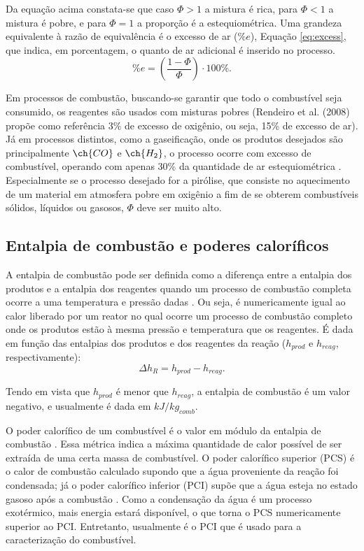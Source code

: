 Da equação acima constata-se que caso $\Phi > 1$ a mistura é rica, para $\Phi < 1$ a mistura é pobre, e para $\Phi = 1$ a proporção é a estequiométrica. Uma grandeza equivalente à razão de equivalência é o excesso de ar ($\%e$), Equação \eqref{eq:excess}, que indica, em porcentagem, o quanto de ar adicional é inserido no processo.
\begin{equation} \label{eq:excess}
\%e = \left(\frac{1-\Phi}{\Phi}\right)\cdot 100\%.
\end{equation}

Em processos de combustão, buscando-se garantir que todo o combustível seja consumido, os reagentes são usados com misturas pobres (Rendeiro et al. (2008) propõe como referência 3\% de excesso de oxigênio, ou seja, 15\% de excesso de ar). Já em processos distintos, como a gaseificação, onde os produtos desejados são principalmente $\ch{CO}$ e $\ch{H_2}$, o processo ocorre com excesso de combustível, operando com apenas 30\% da quantidade de ar estequiométrica \cite{Amazonia}. Especialmente se o processo desejado for a pirólise, que consiste no aquecimento de um material em atmosfera pobre em oxigênio a fim de se obterem combustíveis sólidos, líquidos ou gasosos, $\Phi$ deve ser muito alto.

\subsection{Entalpia de combustão e poderes caloríficos}
A entalpia de combustão pode ser definida como a diferença entre a entalpia dos produtos e a entalpia dos reagentes quando um processo de combustão completa ocorre a uma temperatura e pressão dadas \cite{Shapiro}. Ou seja, é numericamente igual ao calor liberado por um reator no qual ocorre um processo de combustão completo onde os produtos estão à mesma pressão e temperatura que os reagentes. É dada em função das entalpias dos produtos e dos reagentes da reação ($h_{prod}$ e $h_{reag}$, respectivamente):
\begin{equation} \label{eq:entcomb}
\Delta h_R = h_{prod} - h_{reag}.
\end{equation}

\noindent Tendo em vista que $h_{prod}$ é menor que $h_{reag}$, a entalpia de combustão é um valor negativo, e usualmente é dada em $kJ/kg_{comb}$.

O poder calorífico de um combustível é o valor em módulo da entalpia de combustão \cite{Shapiro}. Essa métrica indica a máxima quantidade de calor possível de ser extraída de uma certa massa de combustível. O poder calorífico superior (PCS) é o calor de combustão calculado supondo que a água proveniente da reação foi condensada; já o poder calorífico inferior (PCI) supõe que a água esteja no estado gasoso após a combustão \cite{Turns}. Como a condensação da água é um processo exotérmico, mais energia estará disponível, o que torna o PCS numericamente superior ao PCI. Entretanto, usualmente é o PCI que é usado para a caracterização do combustível.

